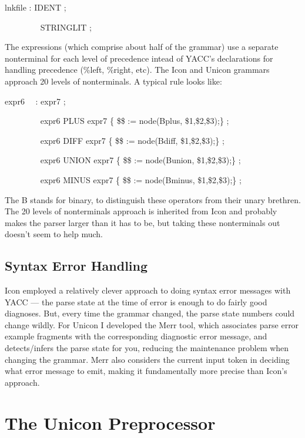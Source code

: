 {\ttfamily\mdseries
lnkfile : IDENT ;}

{\ttfamily\mdseries
\ \ \ \ \ \ \ \ {\textbar} STRINGLIT ;}


The expressions (which comprise about half of the grammar) use a
separate nonterminal for each level of precedence intead of YACC's
declarations for handling precedence (\%left, \%right, etc). The Icon
and Unicon grammars approach 20 levels of nonterminals. A typical rule
looks like:

{\ttfamily\mdseries
expr6 \ \ : expr7 ;}

{\ttfamily\mdseries
\ \ \ \ \ \ \ \ {\textbar} expr6 PLUS expr7 \{ \$\$ := node({\textquotedbl}Bplus{\textquotedbl}, \$1,\$2,\$3);\} ;}

{\ttfamily\mdseries
\ \ \ \ \ \ \ \ {\textbar} expr6 DIFF expr7 \{ \$\$ := node({\textquotedbl}Bdiff{\textquotedbl}, \$1,\$2,\$3);\} ;}

{\ttfamily\mdseries
\ \ \ \ \ \ \ \ {\textbar} expr6 UNION expr7 \{ \$\$ := node({\textquotedbl}Bunion{\textquotedbl}, \$1,\$2,\$3);\} ;}

{\ttfamily\mdseries
\ \ \ \ \ \ \ \ {\textbar} expr6 MINUS expr7 \{ \$\$ := node({\textquotedbl}Bminus{\textquotedbl}, \$1,\$2,\$3);\} ;}


The {\textquotedbl}B{\textquotedbl} stands for
{\textquotedbl}binary{\textquotedbl}, to distinguish these operators
from their unary brethren. The 20 levels of nonterminals approach is
inherited from Icon and probably makes the parser larger than it has
to be, but taking these nonterminals out doesn't seem to help much.

\subsection{Syntax Error Handling}

Icon employed a relatively clever approach to doing syntax error
messages with YACC --- the parse state at the time of error is enough
to do fairly good diagnoses. But, every time the grammar changed, the
parse state numbers could change wildly. For Unicon I developed the
Merr tool, which associates parse error example fragments with the
corresponding diagnostic error message, and detects/infers the parse
state for you, reducing the maintenance problem when changing the
grammar. Merr also considers the current input token in deciding what
error message to emit, making it fundamentally more precise than
Icon's approach.

\section{The Unicon Preprocessor}

